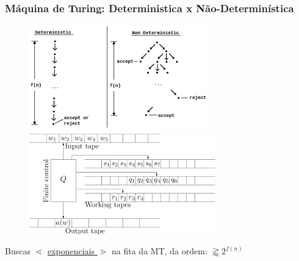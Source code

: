 \documentclass[10pt]{beamer}
\begin{document}


\begin{frame}[fragile]

\frametitle{Máquina de Turing: Deterministica  x  Não-Determinística}
\begin{figure}[!ht]
	
	\begin{minipage}[b]{0.475\linewidth}
		\centering
			\includegraphics[width=\textwidth, height =.4\textheight]
		{figuras/determ_non_determ.png}
	\end{minipage}
	\hspace{0.2cm}
	\begin{minipage}[b]{0.475\linewidth}
		\centering
		\includegraphics[width=\textwidth, height =.4\textheight]{calculo_ND_MT.png}
	\end{minipage}

\end{figure}

\begin{center}

Buscas   $\lessdot$ \underline{ exponenciais } $\gtrdot$ na fita da MT,  da ordem: $ \gtrapprox  2^{f(n)}$ 
\end{center}

\end{frame}
\end{document}
